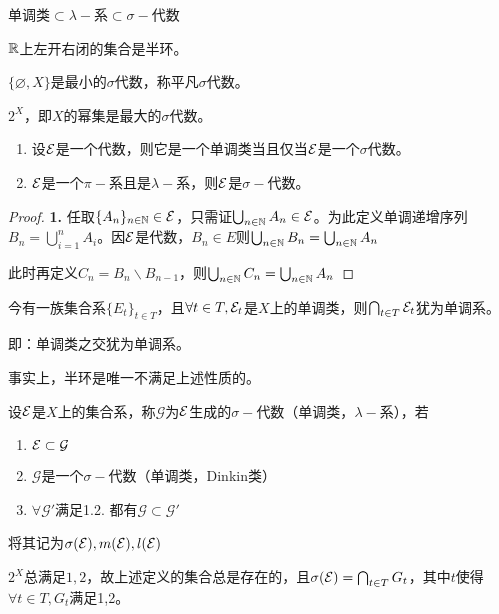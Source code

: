 \documentclass{ctexart}
\begin{document}
单调类$\subset \lambda-$系$\subset\sigma-$代数
\begin{Eg}
  $\mathbb{R}$上左开右闭的集合是半环。%
\end{Eg}

\begin{Eg}
  $\{\varnothing,X\}$是最小的$\sigma$代数，称平凡$\sigma$代数。
\end{Eg}
\begin{Eg}
  $2^{X}$，即$X$的幂集是最大的$\sigma$代数。
\end{Eg}

\begin{Prop}
  \begin{enumerate}
  \item  设$\mathcal{E}$是一个代数，则它是一个单调类当且仅当$\mathcal{E}$是一个$\sigma$代数。
  \item $\mathcal{E}$是一个$\pi-$系且是$\lambda-$系，则$\mathcal{E}$是$\sigma-$代数。
  \end{enumerate}
 \end{Prop}

 \begin{proof}
   \textbf{1.} 任取$\{A_{n}\}_{n\in\mathbb{N}}\in \mathcal{E}$，只需证$\bigcup_{n\in\mathbb{N}} A_{n}\in \mathcal{E}$。为此定义单调递增序列$B_{n}=\bigcup_{i=1}^{n}A_{i}$。因$\mathcal{E}$是代数，$B_{n}\in E$则$\bigcup_{n\in\mathbb{N}}B_{n}=\bigcup_{n\in \mathbb{N}}A_{n}$

   此时再定义$C_{n}=B_{n}\backslash B_{n-1}$，则$\bigcup_{n\in\mathbb{N}}C_{n}=\bigcup_{n\in\mathbb{N}}A_{n}$
 \end{proof}

 \begin{Rmk}
   今有一族集合系$\{E_{t}\}_{t\in T}$，且$\forall t\in T, \mathcal{E}_{t}$是$X$上的单调类，则$\bigcap_{t\in T}\mathcal{E}_{t}$犹为单调系。
 \end{Rmk}
即：单调类之交犹为单调系。
 
事实上，半环是唯一不满足上述性质的。

\begin{Def}
  设$\mathcal{E}$是$X$上的集合系，称$\mathcal{G}$为$\mathcal{E}$生成的$\sigma-$代数（单调类，$\lambda-$系），若
  \begin{enumerate}
  \item $\mathcal{E}\subset \mathcal{G}$
  \item $\mathcal{G}$是一个$\sigma-$代数（单调类，Dinkin类）
  \item $\forall \mathcal{G}'$满足1.2. 都有$\mathcal{G}\subset\mathcal{G}'$
  \end{enumerate}
  将其记为$\sigma(\mathcal{E}),m(\mathcal{E}),l(\mathcal{E})$
\end{Def}
$2^{X}$总满足$1,2$，故上述定义的集合总是存在的，且$\sigma(\mathcal{E})=\bigcap_{t\in T}G_{t}$，其中$t$使得$\forall t\in T, G_{t}$满足1,2。
\end{document}
